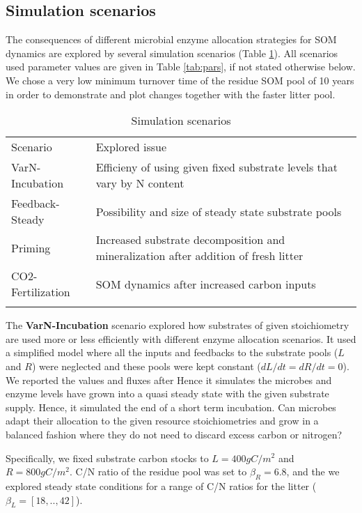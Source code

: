 \subsection{ Simulation scenarios 
\label{sec:SimScen}}

The consequences of different microbial enzyme allocation strategies for SOM
dynamics are explored by several simulation scenarios (Table \ref{tab:SimScen}). 
All scenarios used parameter values are given in Table \ref{tab:pars}, if not
stated otherwise below. We chose a very low minimum turnover time of the
residue SOM pool of 10 years in order to demonstrate and plot changes together
with the faster litter pool.

\begin{table}[t]
\caption{Simulation scenarios \label{tab:SimScen}}
\vskip4mm
\centering
\begin{tabular}{lp{5.3cm}}
\tophline
Scenario & Explored issue\\
\middlehline
VarN-Incubation & Efficieny of using given fixed substrate levels that
vary by N content \\
Feedback-Steady & Possibility and size of steady state substrate pools\\
Priming & Increased substrate decomposition and mineralization after
addition of fresh litter\\
CO2-Fertilization & SOM dynamics after increased carbon inputs\\
\bottomhline
\end{tabular}
\end{table}

The \textbf{VarN-Incubation} scenario explored how substrates of given
stoichiometry are used more or less efficiently with different enzyme allocation
scenarios. It used a simplified model where all the inputs and feedbacks to the
substrate pools ($L$ and $R$) were neglected and these pools were kept constant
($dL/dt = dR/dt = 0$). We reported the values and fluxes after Hence it
simulates the microbes and enzyme levels have grown into a quasi steady state
with the given substrate supply. Hence, it simulated the end of a short term
incubation. Can microbes adapt their allocation to the given resource
stoichiometries and grow in a balanced fashion where they do not need to discard
excess carbon or nitrogen?

Specifically, we fixed substrate carbon stocks to $L=400 gC/m^2$ and
$R=800gC/m^2$. C/N ratio of the residue pool was set to $\beta_R=6.8$, and the
we explored steady state conditions for a range of C/N ratios for the litter
($\beta_L = [18,..,42]$). 


